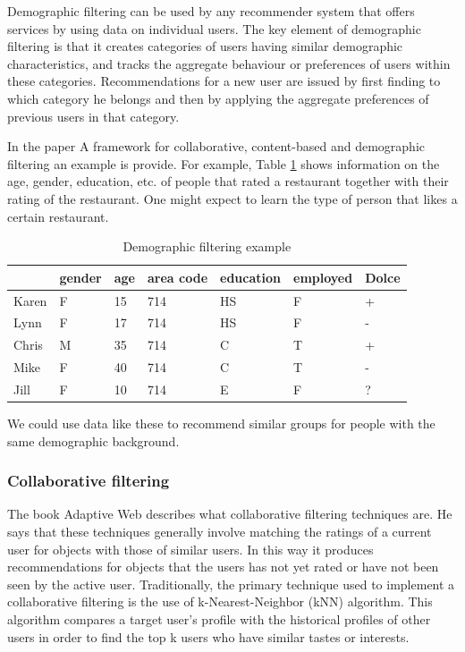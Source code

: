 \documentclass[]{article}
\begin{document}
Demographic filtering can be used by any recommender system that offers services by using data on individual users. 
The key element of demographic filtering is that it creates categories of users having similar demographic characteristics, and tracks the aggregate behaviour or preferences of users within these categories. 
Recommendations for a new user are issued by first finding to which category he belongs and then by applying the aggregate preferences of previous users in that category.

In the paper A framework for collaborative, content-based and demographic filtering\cite{pazzani1999framework} an example is provide. 
For example, Table \ref{table:dfexample}  shows information on the age, gender, education, etc. of people that rated
a restaurant together with their rating of the restaurant. 
One might expect to learn the type of person that likes a certain restaurant. \\ 

\begin{table}[h]
    \begin{tabular}{|l|l|l|l|l|l||l|}
    \hline
    ~     & gender & age & area code & education & employed & Dolce \\ \hline
    Karen & F      & 15  & 714       & HS        & F        & +     \\ \hline
    Lynn  & F      & 17  & 714       & HS        & F        & -     \\ \hline
    Chris & M      & 35  & 714       & C         & T        & +     \\ \hline
    Mike  & F      & 40  & 714       & C         & T        & -     \\ \hline
    Jill  & F      & 10  & 714       & E         & F        & ?     \\ \hline
    \end{tabular}
\caption{Demographic filtering example}
\label{table:dfexample}
\end{table}

\noindent We could use data like these to recommend similar groups for people with the same demographic background.

\subsubsection{Collaborative filtering}
The book Adaptive Web \citep{Peter2007} describes what collaborative filtering techniques are.
He says that these techniques generally involve matching the ratings of a current user for objects with those of similar users.
In this way it produces recommendations for objects that the users has not yet rated or have not been seen by the active user.
Traditionally, the primary technique used to implement a collaborative filtering is the use of k-Nearest-Neighbor (kNN) algorithm.
This algorithm compares a target user's profile with the historical profiles of other users in order to find the top k users who have similar tastes or interests.
\end{document}
